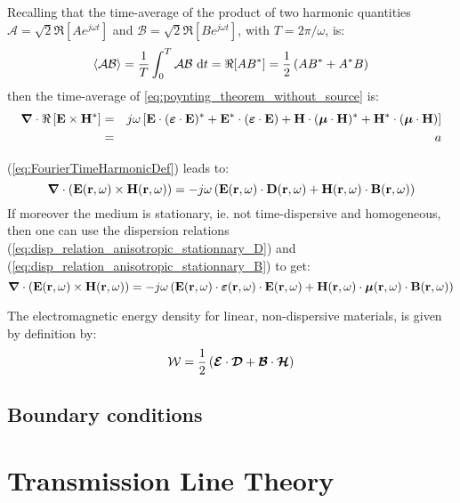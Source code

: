 Recalling that the time-average of the product of two harmonic quantities $\mathcal{A}=\sqrt{2}\Re[Ae^{j\omega t}]$ and $\mathcal{B}=\sqrt{2}\Re[Be^{j\omega t}]$, with $T=2\pi/\omega$, is:
\begin{equation}
\left< \mathcal{A} \mathcal{B}\right>
=
\frac{1}{T} \int_0^T \mathcal{A} \mathcal{B} \, \mathop{}\!\mathrm{d} t
= \Re[AB^*] = \frac{1}{2}\left(AB^* + A^* B \right)
\end{equation}
then the time-average of \ref{eq:poynting_theorem_without_source} is:
\begin{eqnarray*}
\boldsymbol{\nabla}\cdot \Re \left[ \mathbf{E} \times \mathbf{H}^*  \right]
&=&
j \omega \left[ 
\mathbf{E}\cdot(\boldsymbol{\varepsilon} \cdot \mathbf{E})^* + \mathbf{E}^*\cdot(\boldsymbol{\varepsilon} \cdot \mathbf{E}) +
\mathbf{H}\cdot(\boldsymbol{\mu} \cdot \mathbf{H})^* + \mathbf{H}^*\cdot(\boldsymbol{\mu} \cdot \mathbf{H})
\right]
\\
&=& a
\end{eqnarray*}


 (\ref{eq:FourierTimeHarmonicDef}) leads to:
$$
\boldsymbol{\nabla} \cdot \left(\mathbf{E}(\mathbf{r},\omega) \times \mathbf{H}(\mathbf{r},\omega) \right)
=
-j\omega \left(\mathbf{E}(\mathbf{r},\omega)\cdot \mathbf{D}(\mathbf{r},\omega) + \mathbf{H}(\mathbf{r},\omega)\cdot\mathbf{B}(\mathbf{r},\omega) \right)
$$
If moreover the medium is stationary, ie. not time-dispersive and homogeneous, then one can use the dispersion relations (\ref{eq:disp_relation_anisotropic_stationnary_D}) and (\ref{eq:disp_relation_anisotropic_stationnary_B}) to get:
$$
\boldsymbol{\nabla} \cdot \left(\mathbf{E}(\mathbf{r},\omega) \times \mathbf{H}(\mathbf{r},\omega) \right)
=
-j\omega \left(\mathbf{E}(\mathbf{r},\omega)\cdot \boldsymbol{\varepsilon} (\mathbf{r},\omega) \cdot \mathbf{E}(\mathbf{r},\omega) + \mathbf{H}(\mathbf{r},\omega)\cdot\boldsymbol{\mu}(\mathbf{r},\omega)\cdot \mathbf{B}(\mathbf{r},\omega) \right)
$$



The electromagnetic energy density for linear, non-dispersive materials, is given by definition by:
$$
\mathcal{W} = \frac{1}{2} \left( \boldsymbol{\mathcal{E}}\cdot\boldsymbol{\mathcal{D}} + \boldsymbol{\mathcal{B}}\cdot\boldsymbol{\mathcal{H}} \right)
$$



\subsection{Boundary conditions}

\section{Transmission Line Theory}
